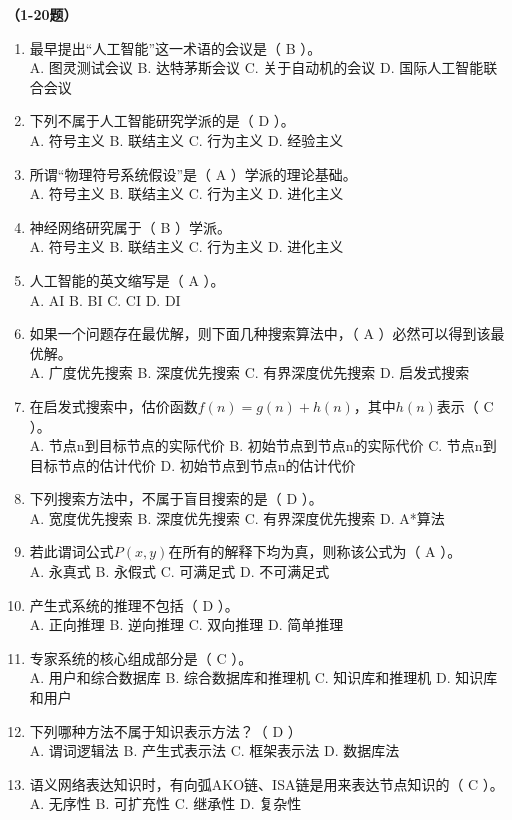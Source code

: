 \textbf{（1-20题）}
\begin{enumerate}[leftmargin=2em,itemsep=1pt]
\item 最早提出“人工智能”这一术语的会议是（ B ）。
\\ A. 图灵测试会议 B. 达特茅斯会议 C. 关于自动机的会议 D. 国际人工智能联合会议
\item 下列不属于人工智能研究学派的是（ D ）。
\\ A. 符号主义 B. 联结主义 C. 行为主义 D. 经验主义
\item 所谓“物理符号系统假设”是（ A ）学派的理论基础。
\\ A. 符号主义 B. 联结主义 C. 行为主义 D. 进化主义
\item 神经网络研究属于（ B ）学派。
\\ A. 符号主义 B. 联结主义 C. 行为主义 D. 进化主义
\item 人工智能的英文缩写是（ A ）。
\\ A. AI B. BI C. CI D. DI
\item 如果一个问题存在最优解，则下面几种搜索算法中，（ A ）必然可以得到该最优解。
\\ A. 广度优先搜索 B. 深度优先搜索 C. 有界深度优先搜索 D. 启发式搜索
\item 在启发式搜索中，估价函数$f(n)=g(n)+h(n)$，其中$h(n)$表示（ C ）。
\\ A. 节点n到目标节点的实际代价 B. 初始节点到节点n的实际代价 C. 节点n到目标节点的估计代价 D. 初始节点到节点n的估计代价
\item 下列搜索方法中，不属于盲目搜索的是（ D ）。
\\ A. 宽度优先搜索 B. 深度优先搜索 C. 有界深度优先搜索 D. A*算法
\item 若此谓词公式$P(x,y)$在所有的解释下均为真，则称该公式为（ A ）。
\\ A. 永真式 B. 永假式 C. 可满足式 D. 不可满足式
\item 产生式系统的推理不包括（ D ）。
\\ A. 正向推理 B. 逆向推理 C. 双向推理 D. 简单推理
\item 专家系统的核心组成部分是（ C ）。
\\ A. 用户和综合数据库 B. 综合数据库和推理机 C. 知识库和推理机 D. 知识库和用户
\item 下列哪种方法不属于知识表示方法？（ D ）
\\ A. 谓词逻辑法 B. 产生式表示法 C. 框架表示法 D. 数据库法
\item 语义网络表达知识时，有向弧AKO链、ISA链是用来表达节点知识的（ C ）。
\\ A. 无序性 B. 可扩充性 C. 继承性 D. 复杂性

\end{enumerate}
